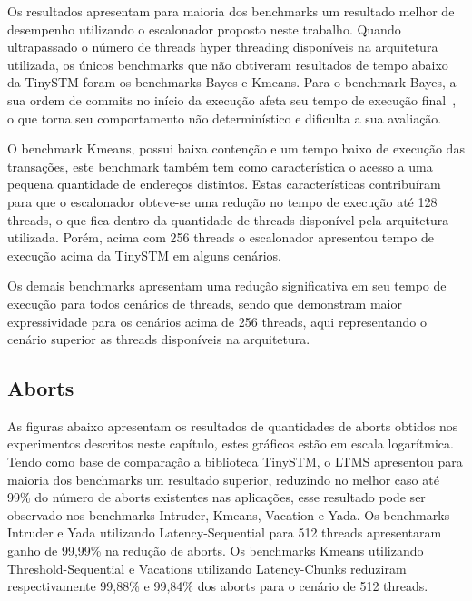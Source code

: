 \documentclass[diss,capa]{texufpel}
\begin{document}


Os resultados apresentam para maioria dos benchmarks um resultado melhor de desempenho utilizando o escalonador proposto neste trabalho. Quando ultrapassado o número de threads hyper threading disponíveis na arquitetura utilizada, os únicos benchmarks que não obtiveram resultados de tempo abaixo da TinySTM foram os benchmarks Bayes e Kmeans. Para o benchmark Bayes, a sua ordem de commits no início da execução afeta seu tempo de execução final~\cite{Ruan:2014}, o que torna seu comportamento não determinístico e dificulta a sua avaliação.

O benchmark Kmeans, possui baixa contenção e um tempo baixo de execução das transações, este benchmark também tem como característica o acesso a uma pequena quantidade de endereços distintos. Estas características contribuíram para que o escalonador obteve-se uma redução no tempo de execução até 128 threads, o que fica dentro da quantidade de threads disponível pela arquitetura utilizada. Porém, acima com 256 threads o escalonador apresentou tempo de execução acima da TinySTM em alguns cenários.

Os demais benchmarks apresentam uma redução significativa em seu tempo de execução para todos cenários de threads, sendo que demonstram maior expressividade para os cenários acima de 256 threads, aqui representando o cenário superior as threads disponíveis na arquitetura.

\subsection{Aborts}

As figuras abaixo apresentam os resultados de quantidades de aborts obtidos nos experimentos descritos neste capítulo, estes gráficos estão em escala logarítmica. Tendo como base de comparação a biblioteca TinySTM, o LTMS apresentou para maioria dos benchmarks um resultado superior, reduzindo no melhor caso até 99\% do número de aborts existentes nas aplicações, esse resultado pode ser observado nos benchmarks Intruder, Kmeans, Vacation e Yada. Os benchmarks Intruder e Yada utilizando Latency-Sequential para 512 threads apresentaram ganho de 99,99\% na redução de aborts. Os benchmarks Kmeans utilizando Threshold-Sequential e Vacations utilizando Latency-Chunks reduziram respectivamente 99,88\% e 99,84\% dos aborts para o cenário de 512 threads.

\end{document}
